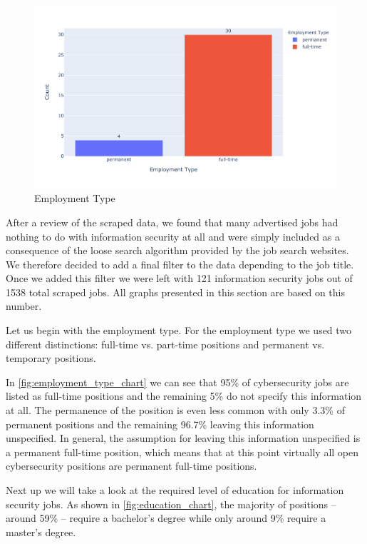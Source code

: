 \documentclass[runningheads]{llncs}
\begin{document}
\begin{figure}[H]
	\centering
  \includegraphics[width=\textwidth]{employment-type-bar-chart.pdf}
	\caption{Employment Type}
	\label{fig:employment_type_chart}
\end{figure}

After a review of the scraped data, we found that many advertised jobs had nothing to do with information security at all and were simply included as a consequence of the loose search algorithm provided by the job search websites. We therefore decided to add a final filter to the data depending to the job title. Once we added this filter we were left with 121 information security jobs out of 1538 total scraped jobs. All graphs presented in this section are based on this number.

Let us begin with the employment type. For the employment type we used two different distinctions: full-time vs. part-time positions and permanent vs. temporary positions.

In \autoref{fig:employment_type_chart} we can see that 95\% of cybersecurity jobs are listed as full-time positions and the remaining 5\% do not specify this information at all. The permanence of the position is even less common with only 3.3\% of permanent positions and the remaining 96.7\% leaving this information unspecified. In general, the assumption for leaving this information unspecified is a permanent full-time position, which means that at this point virtually all open cybersecurity positions are permanent full-time positions.

Next up we will take a look at the required level of education for information security jobs. As shown in \autoref{fig:education_chart}, the majority of positions -- around 59\% -- require a bachelor's degree while only around 9\% require a master's degree.
\end{document}
